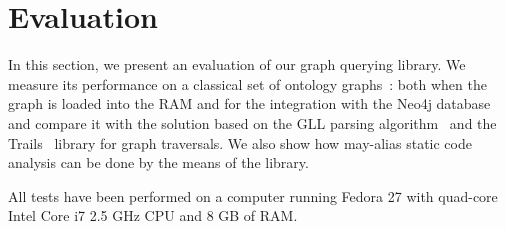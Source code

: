 \section{Evaluation}
\label{sec:evaluation}

In this section, we present an evaluation of our graph querying library.
We measure its performance on a classical set of ontology graphs~\cite{CFGonRDF}: both when the graph is loaded into the RAM and for the integration with the Neo4j database and compare it with the solution based on the GLL parsing algorithm~\cite{GrigorevR16} and the Trails~\cite{ScalaGraphParsing} library for graph traversals. We also show how may-alias static code analysis can be done by the means of the library.

All tests have been performed on a computer running Fedora 27 with quad-core Intel Core i7 2.5 GHz CPU and 8 GB of RAM.

